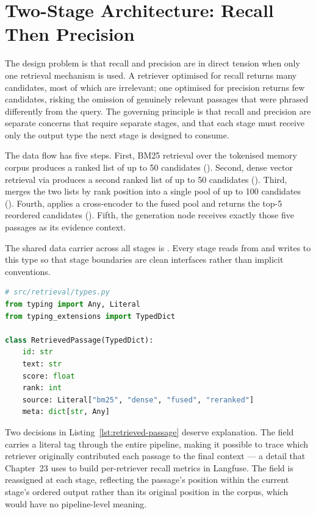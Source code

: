 \section{Two-Stage Architecture: Recall Then Precision}
\label{sec:pipeline-architecture}

The design problem is that recall and precision are in direct tension when
only one retrieval mechanism is used. A retriever optimised for recall returns
many candidates, most of which are irrelevant; one optimised for precision
returns few candidates, risking the omission of genuinely relevant passages
that were phrased differently from the query. The governing principle is that
recall and precision are separate concerns that require separate stages, and
that each stage must receive only the output type the next stage is designed
to consume.

The data flow has five steps. First, BM25 retrieval over the tokenised memory
corpus produces a ranked list of up to 50 candidates
(). Second, dense vector retrieval via
 produces a second ranked list of up to 50 candidates
(). Third,  merges the
two lists by rank position into a single pool of up to 100 candidates
(). Fourth,  applies a
cross-encoder to the fused pool and returns the top-5 reordered candidates
(). Fifth, the generation node receives exactly those
five passages as its evidence context.

The shared data carrier across all stages is . Every
stage reads from and writes to this type so that stage boundaries are clean
interfaces rather than implicit conventions.

\begin{lstlisting}[language=Python,
  caption={Shared passage type used across all pipeline stages},
  label={lst:retrieved-passage}]
# src/retrieval/types.py
from typing import Any, Literal
from typing_extensions import TypedDict

class RetrievedPassage(TypedDict):
    id: str
    text: str
    score: float
    rank: int
    source: Literal["bm25", "dense", "fused", "reranked"]
    meta: dict[str, Any]
\end{lstlisting}

Two decisions in Listing~\ref{lst:retrieved-passage} deserve explanation.
The  field carries a literal tag through the entire pipeline,
making it possible to trace which retriever originally contributed each
passage to the final context --- a detail that Chapter~23 uses to build
per-retriever recall metrics in Langfuse. The  field is
reassigned at each stage, reflecting the passage's position within the
current stage's ordered output rather than its original position in the
corpus, which would have no pipeline-level meaning.

